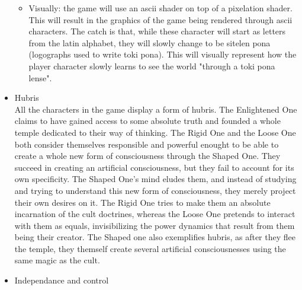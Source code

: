 \documentclass{scrartcl}
\begin{document}
\begin{itemize}
\begin{itemize}
						\item Visually: 
							the game will use an ascii shader on top of a pixelation shader. This will result in the graphics of the game being rendered through ascii characters. The catch is that, while these character will start as letters from the latin alphabet, they will slowly change to be sitelen pona (logographs used to write toki pona). This will visually represent how the player character slowly learns to see the world "through a toki pona lense".
					\end{itemize}		
				\item Hubris\\
					All the characters in the game display a form of hubris. The Enlightened One claims to have gained access to some absolute truth and founded a whole temple dedicated to their way of thinking. The Rigid One and the Loose One both consider themselves responsible and powerful enought to be able to create a whole new form of consciousness through the Shaped One. They succeed in creating an artificial consciousness, but they fail to account for its own specificity. The Shaped One's mind eludes them, and instead of studying and trying to understand this new form of consciousness, they merely project their own desires on it. The Rigid One tries to make them an absolute incarnation of the cult doctrines, whereas the Loose One pretends to interact with them as equals, invisibilizing the power dynamics that result from them being their creator. The Shaped one also exemplifies hubris, as after they flee the temple, they themself create several artificial consciousnesses using the same magic as the cult.
				\item Independance and control
			\end{itemize}
\end{document}
